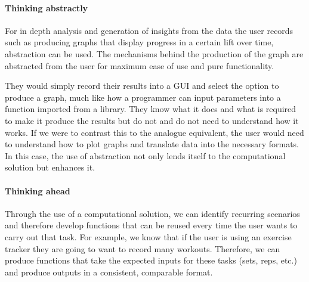 \documentclass{article}
\begin{document}
\paragraph{Thinking abstractly}
For in depth analysis and generation of insights from the data the user records such as producing graphs that display progress in a certain lift over time, abstraction can be used. The mechanisms behind the production of the graph are abstracted from the user for maximum ease of use and pure functionality. 

They would simply record their results into a GUI and select the option to produce a graph, much like how a programmer can input parameters into a function imported from a library. They know what it does and what is required to make it produce the results but do not and do not need to understand how it works. If we were to contrast this to the analogue equivalent, the user would need to understand how to plot graphs and translate data into the necessary formats. In this case, the use of abstraction not only lends itself to the computational solution but enhances it.
\paragraph{Thinking ahead}
Through the use of a computational solution, we can identify recurring scenarios and therefore develop functions that can be reused every time the user wants to carry out that task. For example, we know that if the user is using an exercise tracker they are going to want to record many workouts. Therefore, we can produce functions that take the expected inputs for these tasks (sets, reps, etc.) and produce outputs in a consistent, comparable format.
\newpage
\end{document}
